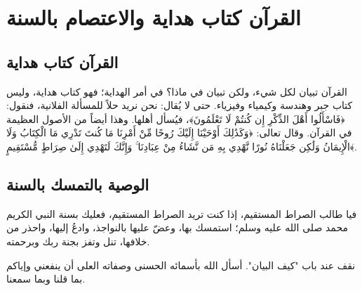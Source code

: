 \chapter{القرآن كتاب هداية والاعتصام بالسنة}

\section{القرآن كتاب هداية}
القرآن تبيان لكل شيء، ولكن تبيان في ماذا؟ في أمر الهداية؛ فهو كتاب هداية، وليس كتاب جبر وهندسة وكيمياء وفيزياء. حتى لا يُقال: نحن نريد حلاً للمسألة الفلانية، فنقول: ﴿فَاسْأَلُوا أَهْلَ الذِّكْرِ إِن كُنتُمْ لَا تَعْلَمُونَ﴾، فيُسأل أهلها. وهذا أيضاً من الأصول العظيمة في القرآن. وقال تعالى: ﴿وَكَذَٰلِكَ أَوْحَيْنَا إِلَيْكَ رُوحًا مِّنْ أَمْرِنَا مَا كُنتَ تَدْرِي مَا الْكِتَابُ وَلَا الْإِيمَانُ وَلَٰكِن جَعَلْنَاهُ نُورًا نَّهْدِي بِهِ مَن نَّشَاءُ مِنْ عِبَادِنَا ۚ وَإِنَّكَ لَتَهْدِي إِلَىٰ صِرَاطٍ مُّسْتَقِيمٍ﴾.

\section{الوصية بالتمسك بالسنة}
فيا طالب الصراط المستقيم، إذا كنت تريد الصراط المستقيم، فعليك بسنة النبي الكريم محمد صلى الله عليه وسلم؛ استمسك بها، وعضّ عليها بالنواجذ، وادعُ إليها، واحذر من خلافها، تنل وتفز بجنة ربك وبرحمته.

نقف عند باب "كيف البيان". أسأل الله بأسمائه الحسنى وصفاته العلى أن ينفعني وإياكم بما قلنا وبما سمعنا.